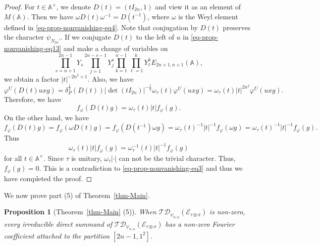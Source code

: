 \documentclass[12pt]{amsart}
\newcommand{\A}{\mathbb{A}}
\newcommand{\TD}{\mathcal{TD}}
\newcommand{\CE}{{\mathcal{E}}}
\newtheorem{proposition}[theorem]{Proposition}%
\theoremstyle{remark}
\begin{document}
\begin{proof}
 For $t\in \A^\times$, we denote $D(t)=(tI_{2n}, 1)$ and view it as an element of $M(\A)$. Then we have $\omega D(t) \omega^{-1}= D(t^{-1})$, where $\omega$ is the Weyl element defined in \eqref{eq-prop-nonvanishing-eq4}. 
 Note that conjugation by $D(t)$ preserves the character $\psi_{N_{2n}'}$. If we conjugate $D(t)$ to the left of $u$ in \eqref{eq-prop-nonvanishing-eq13}  and make a change of variables on 
 $$\prod_{s=n+1}^{2n-1} Y_s \prod_{j=1}^{2n-s-1} Y^s_j\prod_{k=1}^{n-1} \prod_{\ell=1}^k Y^k_{\ell}
E_{2n+1,n+1}
(\A),$$
we obtain a factor $|t|^{-2n^2+1}$. Also, we have
\begin{equation*}
\varphi^U(D(t)uxg)=\delta_P^{\frac{1}{2}} (D(t)) |\det(tI_{2n})|^{-\frac{1}{2}} \omega_{\tau}(t) \varphi^U(uxg)=\omega_{\tau}(t)|t|^{2n^2} \varphi^U(uxg). 
\end{equation*}
Therefore, we have
\begin{equation*}
f_{\varphi}(D(t)g)=\omega_{\tau}(t) |t| f_{\varphi}(g). 	
\end{equation*}
On the other hand, we have
\begin{equation*}
f_{\varphi}(D(t)g)=f_{\varphi}(\omega D(t) g)=f_{\varphi}(D(t^{-1})\omega g) 	=\omega_{\tau}(t)^{-1}|t|^{-1} f_{\varphi}(\omega g)=\omega_{\tau}(t)^{-1}|t|^{-1} f_{\varphi}(g).
\end{equation*}
Thus
\begin{equation*}
\omega_{\tau}(t) |t| f_{\varphi}(g) = 	\omega_{\tau}^{-1}(t) |t|^{-1} f_{\varphi}(g)
\end{equation*}
for all $t\in \A^\times$. Since $\tau$ is unitary, $\omega_\tau |\cdot|$ can not be the trivial character. Thus, $f_{\varphi}(g)=0$. 
This is a contradiction to \eqref{eq-prop-nonvanishing-eq3} and thus we have completed the proof.
\end{proof}


We now prove part (5) of Theorem~\ref{thm-Main}.
\begin{proposition}[Theorem~\ref{thm-Main} (5)]
\label{prop-part5}
When $\TD_{\psi_{n,\alpha}}(\CE_{\tau\otimes\sigma})$ is non-zero, every irreducible direct summand of $\TD_{\psi_{n,\alpha}}(\CE_{\tau\otimes\sigma})$ has a non-zero Fourier coefficient attached to the partition $[2n-1,1^2]$.
\end{proposition}
\end{document}
